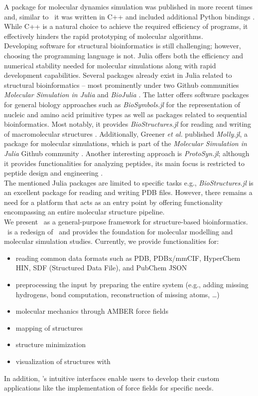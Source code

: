 A package for molecular dynamics simulation was published in more recent times and, similar to \ball\, it was written in C++ and included additional Python bindings \cite{Doerr2016HTMD}. While C++ is a natural choice to achieve the required efficiency of programs, it effectively hinders the rapid prototyping of molecular algorithms.  \\
Developing software for structural bioinformatics is still challenging; however, choosing the programming language is not. Julia offers both the efficiency and numerical stability needed for molecular simulations along with rapid development capabilities. Several packages already exist in Julia related to structural bioinformatics -- most prominently under two Github communities \textit{Molecular Simulation in Julia} and \textit{BioJulia} \cite{JuliaMolSim, BioJulia}. The latter offers software packages for general biology approaches such as \textit{BioSymbols.jl} for the representation of nucleic and amino acid primitive types as well as packages related to sequential bioinformatics. Most notably, it provides \textit{BioStructures.jl} for reading and writing of macromolecular structures \cite{Greener2020BioStructures}. Additionally, Greener \textit{et al.} published \textit{Molly.jl}, a package for molecular simulations, which is part of the \textit{Molecular Simulation in Julia} Github community \cite{Greener2024}.
Another interesting approach is \textit{ProtoSyn.jl}; although it provides functionalities for analyzing peptides, its main focus is restricted to peptide design and engineering \cite{ProtoSyn}. \\
The mentioned Julia packages are limited to specific tasks e.g., \textit{BioStructures.jl} is an excellent package for reading and writing PDB files. However, there remains a need for a platform that acts as an entry point by offering functionality encompassing an entire molecular structure pipeline.\\
We present \biochem\ as a general-purpose framework for structure-based bioinformatics. \biochem\ is a redesign of \ball\ and provides the foundation for molecular modelling and molecular simulation studies. Currently, we provide functionalities for:
\begin{itemize}
	\item reading common data formats such as PDB, PDBx/mmCIF, HyperChem HIN, SDF (Structured Data File), and PubChem JSON
	\item preprocessing the input by preparing the entire system (e.g., adding missing hydrogens, bond computation, reconstruction of missing atoms, \dots)
	\item molecular mechanics through AMBER force fields 
	\item mapping of structures
	\item structure minimization
	\item visualization of structures with \bioviz
\end{itemize}
In addition, \biochem's intuitive interfaces enable users to develop their custom applications like the implementation of force fields for specific needs. \\

